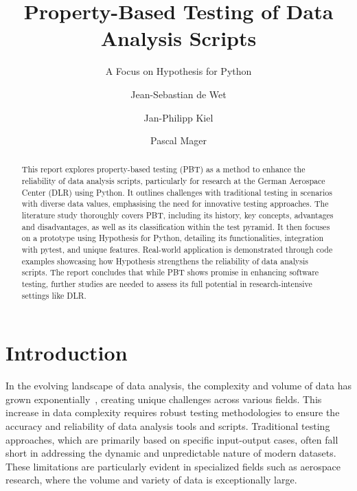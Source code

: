 \documentclass[runningheads]{llncs}
\begin{document}
%
\title{Property-Based Testing of Data Analysis Scripts}
\subtitle{A Focus on Hypothesis for Python}
%
%
\author{Jean-Sebastian de Wet \and
  Jan-Philipp Kiel \and
  Pascal Mager}
%
%
%
\maketitle              %
%
\begin{abstract}
  This report explores property-based testing (PBT) as a meth\-od to enhance the reliability of data analysis scripts, particularly for research at the German Aerospace Center (DLR) using Python. It outlines challenges with traditional testing in scenarios with diverse data values, emphasising the need for innovative testing approaches. The literature study thoroughly covers PBT, including its history, key concepts, advantages and disadvantages, as well as its classification within the test pyramid. It then focuses on a prototype using Hypothesis for Python, detailing its functionalities, integration with pytest, and unique features. Real-world application is demonstrated through code examples showcasing how Hypothesis strengthens the reliability of data analysis scripts. The report concludes that while PBT shows promise in enhancing software testing, further studies are needed to assess its full potential in research-intensive settings like DLR.

\end{abstract}
%
%
%
\section{Introduction}
In the evolving landscape of data analysis, the complexity and volume of data has grown exponentially~\cite{Taylor2023}, creating unique challenges across various fields. This increase in data complexity requires robust testing methodologies to ensure the accuracy and reliability of data analysis tools and scripts. Traditional testing approaches, which are primarily based on specific input-output cases, often fall short in addressing the dynamic and unpredictable nature of modern datasets. These limitations are particularly evident in specialized fields such as aerospace research, where the volume and variety of data is exceptionally large.
\end{document}
